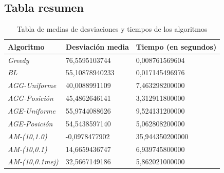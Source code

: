 \documentclass{article}
\begin{document}
\subsection{Tabla resumen}
\begin{table}[h]
  \begin{center}
    \begin{spacing}{1.5}
    \begin{tabular}{| l | l | l | }
      \hline
      \textbf{Algoritmo} & \textbf{Desviación media} & \textbf{Tiempo (en segundos)} \\ \hline
      \emph{Greedy} & 76,5595103744  & 0,008761569604 \\ \hline

      \emph{BL} & 55,10878940233 & 0,017145496976 \\ \hline

      \emph{AGG-Uniforme} & 40,0088991109 & 7,463298200000 \\ \hline

      \emph{AGG-Posición} & 45,4862646141 & 3,312911800000 \\ \hline

      \emph{AGE-Uniforme} & 55,9744088626 & 9,524131200000 \\ \hline

      \emph{AGE-Posición} & 54,5438597140 & 5,062808200000 \\ \hline

      \emph{AM-(10,1.0)} & -0,0978477902 & 35,944350200000 \\ \hline

      \emph{AM-(10,0.1)} & 14,6659436747 & 6,939745800000 \\ \hline

      \emph{AM-(10,0.1mej)} & 32,5667149186 & 5,862021000000 \\ \hline

    \end{tabular}
    \end{spacing}
    \caption{Tabla de medias de desviaciones y tiempos de los algoritmos}
  \end{center}
\end{table}
\end{document}
